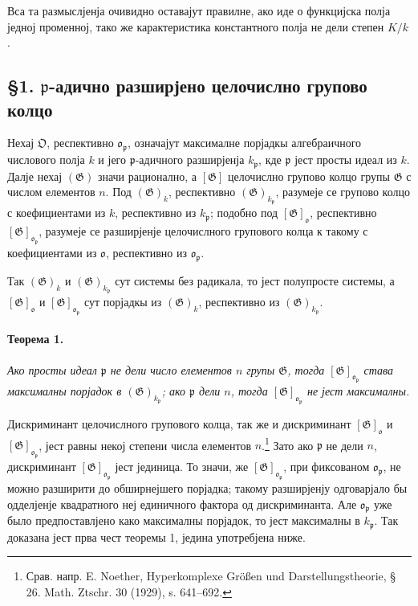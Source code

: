 \documentclass[11pt]{article}
\providecommand{\frakO}{\mathfrak{O}}
\providecommand{\frako}{\mathfrak{o}}
\providecommand{\frakp}{\mathfrak{p}}
\providecommand{\Gg}{\mathfrak{G}}
\begin{document}
Вса та размыслјенја очивидно оставајут правилне, ако иде о функцијска полја једној променној, тако же карактеристика константного полја не дели степен \(K/k\).

\subsection*{§1. \(\frakp\)-адично разширјено целочислно групово колцо}

Нехај \(\frakO\), респективно \(\frako_\frakp\), означајут максималне порјадкы алгебраичного числового полја \(k\) и јего \(\frakp\)-адичного разширјенја \(k_\frakp\), кде \(\frakp\) јест просты идеал из \(k\). Далје нехај \((\Gg)\) значи рационално, а \([\Gg]\) целочислно групово колцо групы \(\Gg\) с числом елементов \(n\). Под \((\Gg)_k\), респективно \((\Gg)_{k_\frakp}\), разумеје се групово колцо с коефициентами из \(k\), респективно из \(k_\frakp\); подобно под \([\Gg]_\frako\), респективно \([\Gg]_{\frako_\frakp}\), разумеје се разширјенје целочислного групового колца к такому с коефициентами из \(\frako\), респективно из \(\frako_\frakp\).

Так \((\Gg)_k\) и \((\Gg)_{k_\frakp}\) сут системы без радикала, то јест полупросте системы, а \([\Gg]_\frako\) и \([\Gg]_{\frako_\frakp}\) сут порјадкы из \((\Gg)_k\), респективно из \((\Gg)_{k_\frakp}\).

\paragraph{Теорема 1.}
\emph{Ако просты идеал \(\frakp\) не дели число елементов \(n\) групы \(\Gg\), тогда \([\Gg]_{\frako_\frakp}\) става максималны порјадок в \((\Gg)_{k_\frakp}\); ако \(\frakp\) дели \(n\), тогда \([\Gg]_{\frako_\frakp}\) не јест максималны.}

Дискриминант целочислного групового колца, так же и дискриминант \([\Gg]_\frako\) и \([\Gg]_{\frako_\frakp}\), јест равны некој степени числа елементов \(n\).\footnote{Срав. напр. E. Noether, Hyperkomplexe Größen und Darstellungstheorie, § 26. Math. Ztschr. 30 (1929), s. 641--692.} Зато ако \(\frakp\) не дели \(n\), дискриминант \([\Gg]_{\frako_\frakp}\) јест јединица. То значи, же \([\Gg]_{\frako_\frakp}\), при фиксованом \(\frako_\frakp\), не можно разширити до обширнејшего порјадка; такому разширјенју одговарјало бы одделјенје квадратного неј единичного фактора од дискриминанта. Але \(\frako_\frakp\) уже было предпоставлјено како максималны порјадок, то јест максималны в \(k_\frakp\). Так доказана јест прва чест теоремы 1, једина употребјена ниже.
\end{document}
